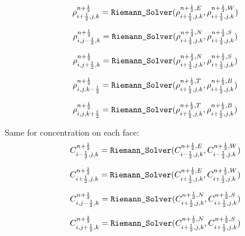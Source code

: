 \documentclass{article}
\numberwithin{equation}{subsection}
\begin{document}
\begin{equation}
\rho^{n+\frac{1}{2}}_{i+\frac{1}{2},j,k} = \verb|Riemann_Solver|(\rho^{n+\frac{1}{2},E}_{i+\frac{1}{2},j,k}, \rho^{n+\frac{1}{2},W}_{i+\frac{1}{2},j,k})
\end{equation}

\begin{equation}
\rho^{n+\frac{1}{2}}_{i,j-\frac{1}{2},k} = \verb|Riemann_Solver|(\rho^{n+\frac{1}{2},N}_{i+\frac{1}{2},j,k}, \rho^{n+\frac{1}{2},S}_{i+\frac{1}{2},j,k})
\end{equation}

\begin{equation}
\rho^{n+\frac{1}{2}}_{i,j+\frac{1}{2},k} = \verb|Riemann_Solver|(\rho^{n+\frac{1}{2},N}_{i+\frac{1}{2},j,k}, \rho^{n+\frac{1}{2},S}_{i+\frac{1}{2},j,k})
\end{equation}

\begin{equation}
\rho^{n+\frac{1}{2}}_{i,j,k-\frac{1}{2}} = \verb|Riemann_Solver|(\rho^{n+\frac{1}{2},T}_{i+\frac{1}{2},j,k}, \rho^{n+\frac{1}{2},B}_{i+\frac{1}{2},j,k})
\end{equation}

\begin{equation}
\rho^{n+\frac{1}{2}}_{i,j,k+\frac{1}{2}} = \verb|Riemann_Solver|(\rho^{n+\frac{1}{2},T}_{i+\frac{1}{2},j,k}, \rho^{n+\frac{1}{2},B}_{i+\frac{1}{2},j,k})
\end{equation}

Same for concentration on each face:
\begin{equation}
C^{n+\frac{1}{2}}_{i-\frac{1}{2},j,k} = \verb|Riemann_Solver|(C^{n+\frac{1}{2},E}_{i-\frac{1}{2},j,k}, C^{n+\frac{1}{2},W}_{i-\frac{1}{2},j,k})
\end{equation}

\begin{equation}
C^{n+\frac{1}{2}}_{i+\frac{1}{2},j,k} = \verb|Riemann_Solver|(C^{n+\frac{1}{2},E}_{i+\frac{1}{2},j,k}, C^{n+\frac{1}{2},W}_{i+\frac{1}{2},j,k})
\end{equation}

\begin{equation}
C^{n+\frac{1}{2}}_{i,j-\frac{1}{2},k} = \verb|Riemann_Solver|(C^{n+\frac{1}{2},N}_{i+\frac{1}{2},j,k}, C^{n+\frac{1}{2},S}_{i+\frac{1}{2},j,k})
\end{equation}

\begin{equation}
C^{n+\frac{1}{2}}_{i,j+\frac{1}{2},k} = \verb|Riemann_Solver|(C^{n+\frac{1}{2},N}_{i+\frac{1}{2},j,k}, C^{n+\frac{1}{2},S}_{i+\frac{1}{2},j,k})
\end{equation}
\end{document}
